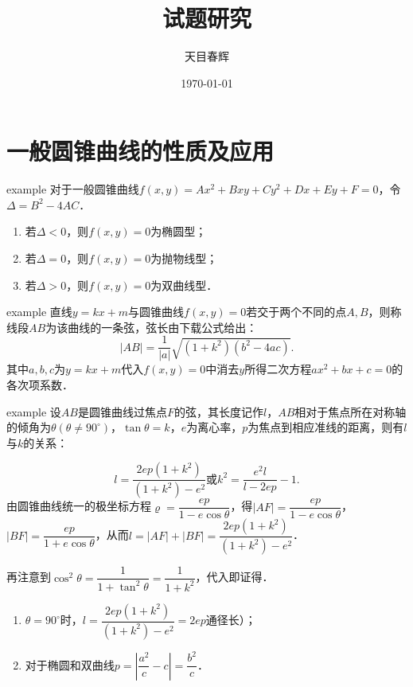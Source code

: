 \documentclass[a4paper,10pt]{ctexbook}
\title{试题研究}
\author{天目春辉}
\date{\today}
\begin{document}
\maketitle
\chapter{一般圆锥曲线的性质及应用}


\begin{point}{}{example}
    对于一般圆锥曲线$f\left(x,y\right)=Ax^2+Bxy+Cy^2+Dx+Ey+F=0$，令$\Delta=B^2-4AC$．
    \begin{enumerate}
        \item 若$\Delta<0$，则$f\left(x,y\right)=0$为椭圆型；
        \item 若$\Delta=0$，则$f\left(x,y\right)=0$为抛物线型；
        \item 若$\Delta>0$，则$f\left(x,y\right)=0$为双曲线型．
    \end{enumerate}
\end{point}

\begin{property}{}{example}
    直线$y=kx+m$与圆锥曲线$f\left(x,y\right)=0$若交于两个不同的点$A,B$，则称线段$AB$为该曲线的一条弦，弦长由下载公式给出：
    $$\left|AB\right|=\dfrac{1}{\left|a\right|}\sqrt{\left(1+k^2\right)\left(b^2-4ac\right)}.$$
    其中$a,b,c$为$y=kx+m$代入$f\left(x,y\right)=0$中消去$y$所得二次方程$ax^2+bx+c=0$的各次项系数．
\end{property}

\begin{property}{}{example}
    设$AB$是圆锥曲线过焦点$F$的弦，其长度记作$l$，$AB$相对于焦点所在对称轴的倾角为$\theta\left(\theta\neq 90^{\circ}\right)$，$\tan \theta=k$，$e$为离心率，$p$为焦点到相应准线的距离，则有$l$与$k$的关系：

    $$l=\dfrac{2ep\left(1+k^2\right)}{\left(1+k^2\right)-e^2}\text{或}k^2=\dfrac{e^2l}{l-2ep}-1.$$
    由圆锥曲线统一的极坐标方程$\varrho=\dfrac{ep}{1-e\cos\theta}$，得$\left|AF\right|=\dfrac{ep}{1-e\cos\theta}$，$\left|BF\right|=\dfrac{ep}{1+e\cos\theta}$，从而$l=\left|AF\right|+\left|BF\right|=\dfrac{2ep\left(1+k^2\right)}{\left(1+k^2\right)-e^2}$．

    再注意到$\cos^2 \theta=\dfrac{1}{1+\tan^2 \theta}=\dfrac{1}{1+k^2}$，代入即证得．

    \begin{enumerate}
        \item $\theta =90^{\circ}$时，$l=\dfrac{2ep\left(1+k^2\right)}{\left(1+k^2\right)-e^2}=2ep$通径长）；
        \item 对于椭圆和双曲线$p=\left|\dfrac{a^2}{c}-c\right|=\dfrac{b^2}{c}$．
    \end{enumerate}
\end{property}
\end{document}
